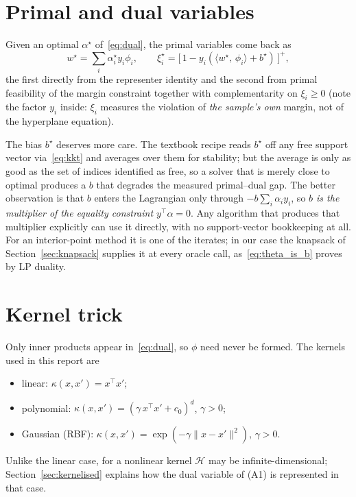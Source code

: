 \documentclass[11pt,a4paper]{report}
\newcommand{\Hs}{\mathcal{H}}
\newcommand{\inner}[2]{\langle #1,\, #2 \rangle}
\begin{document}
\section{Primal and dual variables}
\label{sec:recovery}
Given an optimal $\alpha^\star$ of~\eqref{eq:dual}, the primal variables come back as
\[
w^\star=\sum_i\alpha^\star_iy_i\phi_i,
\qquad
\xi^\star_i=\bigl[\,1-y_i(\inner{w^\star}{\phi_i}+b^\star)\,\bigr]^+ ,
\]
the first directly from the representer identity and the second from primal
feasibility of the margin constraint together with complementarity on $\xi_i\ge0$
(note the factor $y_i$ inside: $\xi_i$ measures the violation of \emph{the sample's
own} margin, not of the hyperplane equation).

The bias $b^\star$ deserves more care. The textbook recipe reads $b^\star$ off any
free support vector via~\eqref{eq:kkt} and averages over them for stability; but the
average is only as good as the set of indices identified as free, so a solver that
is merely close to optimal produces a $b$ that degrades the measured primal--dual
gap. The better observation is that $b$ enters the Lagrangian only through
$-b\sum_i\alpha_iy_i$, so \emph{$b$ is the multiplier of the equality constraint
$y^{\!\top}\alpha=0$}. Any algorithm that produces that multiplier explicitly can use
it directly, with no support-vector bookkeeping at all. For an interior-point method
it is one of the iterates; in our case the knapsack of Section~\ref{sec:knapsack}
supplies it at every oracle call, as~\eqref{eq:theta_is_b} proves by LP duality.

\section{Kernel trick}
Only inner products appear in~\eqref{eq:dual}, so $\phi$ need never be formed. The
kernels used in this report are
\begin{itemize}
\item linear: $\kappa(x,x')=x^{\!\top}x'$;
\item polynomial: $\kappa(x,x')=(\gamma\,x^{\!\top}x'+c_0)^d$, $\gamma>0$;
\item Gaussian (RBF): $\kappa(x,x')=\exp(-\gamma\|x-x'\|^2)$, $\gamma>0$.
\end{itemize}
Unlike the linear case, for a nonlinear kernel $\Hs$ may be infinite-dimensional;
Section~\ref{sec:kernelised} explains how the dual variable of (A1) is represented in
that case.

\end{document}
